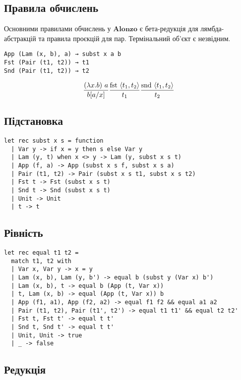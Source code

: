 \documentclass{article}
\begin{document}
\subsection{Правила обчислень}

Основними правилами обчислень у $\mathbf{Alonzo}$ є бета-редукція для лямбда-абстракцій та правила проєкцій для пар. Термінальний об’єкт є незвідним.

\begin{lstlisting}[mathescape=true]
App (Lam (x, b), a) → subst x a b
Fst (Pair (t1, t2)) → t1
Snd (Pair (t1, t2)) → t2
\end{lstlisting}

$$
\frac{(\lambda x . b)\ a}{b [a/x]} \\[10pt]
\frac{\text{fst}\ \langle t_1, t_2 \rangle}{t_1} \\[10pt]
\frac{\text{snd}\ \langle t_1, t_2 \rangle}{t_2}
$$

\newpage
\subsection{Підстановка}

\begin{lstlisting}[mathescape=true]
let rec subst x s = function
  | Var y -> if x = y then s else Var y
  | Lam (y, t) when x <> y -> Lam (y, subst x s t)
  | App (f, a) -> App (subst x s f, subst x s a)
  | Pair (t1, t2) -> Pair (subst x s t1, subst x s t2)
  | Fst t -> Fst (subst x s t)
  | Snd t -> Snd (subst x s t)
  | Unit -> Unit
  | t -> t
\end{lstlisting}

\subsection{Рівність}

\begin{lstlisting}[mathescape=true]
let rec equal t1 t2 =
  match t1, t2 with
  | Var x, Var y -> x = y
  | Lam (x, b), Lam (y, b') -> equal b (subst y (Var x) b')
  | Lam (x, b), t -> equal b (App (t, Var x))
  | t, Lam (x, b) -> equal (App (t, Var x)) b
  | App (f1, a1), App (f2, a2) -> equal f1 f2 && equal a1 a2
  | Pair (t1, t2), Pair (t1', t2') -> equal t1 t1' && equal t2 t2'
  | Fst t, Fst t' -> equal t t'
  | Snd t, Snd t' -> equal t t'
  | Unit, Unit -> true
  | _ -> false
\end{lstlisting}

\subsection{Редукція}
\end{document}
